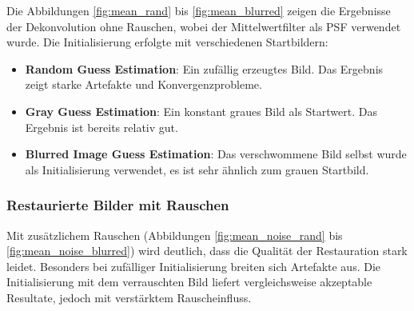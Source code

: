 Die Abbildungen \ref{fig:mean_rand} bis \ref{fig:mean_blurred} zeigen die Ergebnisse der Dekonvolution ohne Rauschen, wobei der Mittelwertfilter als PSF verwendet wurde. Die Initialisierung erfolgte mit verschiedenen Startbildern:

\begin{itemize}
    \item \textbf{Random Guess Estimation}: Ein zufällig erzeugtes Bild. Das Ergebnis zeigt starke Artefakte und Konvergenzprobleme.
    \item \textbf{Gray Guess Estimation}: Ein konstant graues Bild als Startwert. Das Ergebnis ist bereits relativ gut.
    \item \textbf{Blurred Image Guess Estimation}: Das verschwommene Bild selbst wurde als Initialisierung verwendet, es ist sehr ähnlich zum grauen Startbild.
\end{itemize}

\noindent
\begin{minipage}[t]{0.33\textwidth}
\end{minipage}
%
\begin{minipage}[t]{0.33\textwidth}
\end{minipage}
%
\begin{minipage}[t]{0.33\textwidth}
\end{minipage}


\subsubsection{Restaurierte Bilder mit Rauschen}

Mit zusätzlichem Rauschen (Abbildungen \ref{fig:mean_noise_rand} bis \ref{fig:mean_noise_blurred}) wird deutlich, dass die Qualität der Restauration stark leidet. Besonders bei zufälliger Initialisierung breiten sich Artefakte aus. Die Initialisierung mit dem verrauschten Bild liefert vergleichsweise akzeptable Resultate, jedoch mit verstärktem Rauscheinfluss.

\noindent
\begin{minipage}[t]{0.33\textwidth}
\end{minipage}
%
\begin{minipage}[t]{0.33\textwidth}
\end{minipage}
%
\begin{minipage}[t]{0.33\textwidth}
\end{minipage}


